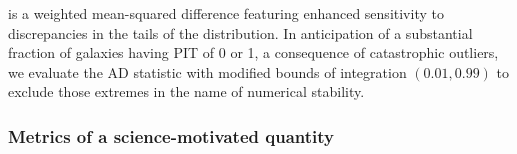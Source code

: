 is a weighted mean-squared difference featuring enhanced sensitivity to discrepancies in the tails of the distribution.
In anticipation of a substantial fraction of galaxies having PIT of 0 or 1, a consequence of catastrophic outliers, we evaluate the AD statistic with modified bounds of integration $(0.01, 0.99)$ to exclude those extremes in the name of numerical stability.

%

\subsubsection{Metrics of a science-motivated quantity}
\label{sec:moments}

